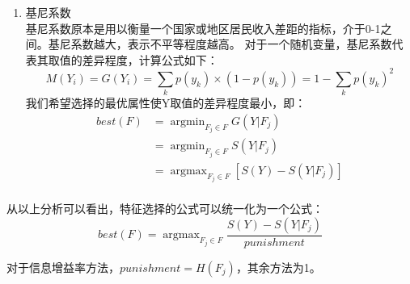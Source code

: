 \documentclass[UTF8,a4paper,12pt]{article}
\begin{document}
\begin{enumerate}[itemindent=0.5em,label=\arabic*、]
  \item 基尼系数\\
  基尼系数原本是用以衡量一个国家或地区居民收入差距的指标，介于0-1之间。基尼系数越大，表示不平等程度越高。
  对于一个随机变量，基尼系数代表其取值的差异程度，计算公式如下：
  \begin{equation}
      M(Y_i) = G(Y_i) = \sum_{k}p(y_k) \times (1 - p(y_k)) = 1 - \sum_{k}p(y_k)^2
  \end{equation}
  我们希望选择的最优属性使Y取值的差异程度最小，即：
  \begin{equation}
    \begin{aligned}
      best(F) &= \mathop{\arg\min}_{F_j \in F}{G(Y|F_j)}\\
      &= \mathop{\arg\min}_{F_j \in F}{S(Y|F_j)}\\
       &= \mathop{\arg\max}_{F_j \in F}{[S(Y) - S(Y|F_j)]}\\
    \end{aligned}
  \end{equation}
\end{enumerate}
\par 从以上分析可以看出，特征选择的公式可以统一化为一个公式：
\begin{equation}
    best(F) = \mathop{\arg\max}_{F_j \in F}{\frac{S(Y) - S(Y|F_j)}{punishment}}
\end{equation}
\par 对于信息增益率方法，$punishment=H(F_j)$，其余方法为1。
\newpage
\end{document}

